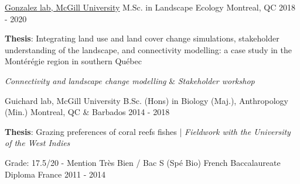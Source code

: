 

\begin{cventries}

  \cventry
    {\href{http://gonzalezlab.weebly.com/}{Gonzalez lab, McGill University}} %
    {M.Sc. in Landscape Ecology} %
    {Montreal, QC} %
    {2018 - 2020} %
    {
      \begin{cvitems} %
        \item {\textbf{Thesis}: Integrating land use and land cover change simulations, stakeholder understanding of the landscape, and connectivity modelling: a case study in the Montérégie region in southern Québec}
        \item {\textit{Connectivity and landscape change modelling}  \& \textit{Stakeholder workshop}}
      \end{cvitems}
    }


    \cventry
    {Guichard lab, McGill University} %
    {B.Sc. (Hons) in Biology (Maj.), Anthropology (Min.)} %
    {Montreal, QC \& Barbados} %
    {2014 - 2018} %
    {
      \begin{cvitems} %
        \item {\textbf{Thesis}: Grazing preferences of coral reefs fishes | \textit{Fieldwork with the University of the West Indies}}
      \end{cvitems}
    }

    \cventry
    {Grade: 17.5/20 - Mention Très Bien / Bac S (Spé Bio)} %
    {French Baccalaureate Diploma} %
    {France} %
    {2011 - 2014} %
    {}

\end{cventries}
